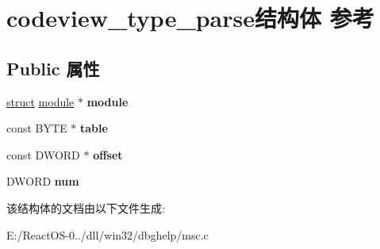 \hypertarget{structcodeview__type__parse}{}\section{codeview\+\_\+type\+\_\+parse结构体 参考}
\label{structcodeview__type__parse}
\subsection*{Public 属性}
\begin{DoxyCompactItemize}
\item 
\mbox{\label{structcodeview__type__parse_a8347fe79eacfed3328ab8ca2eb37f0bb}} 
\hyperlink{interfacestruct}{struct} \hyperlink{structmodule}{module} $\ast$ {\bfseries module}
\item 
\mbox{\label{structcodeview__type__parse_a3caf9791e5c95edc1d03a1d305f06e1f}} 
const B\+Y\+TE $\ast$ {\bfseries table}
\item 
\mbox{\label{structcodeview__type__parse_acf174df705647f7b7a0547c710be3450}} 
const D\+W\+O\+RD $\ast$ {\bfseries offset}
\item 
\mbox{\label{structcodeview__type__parse_a73557d8aa1ea71e636df69f0bb2d6998}} 
D\+W\+O\+RD {\bfseries num}
\end{DoxyCompactItemize}


该结构体的文档由以下文件生成\+:\begin{DoxyCompactItemize}
\item 
E\+:/\+React\+O\+S-\/0../dll/win32/dbghelp/msc.\+c\end{DoxyCompactItemize}
